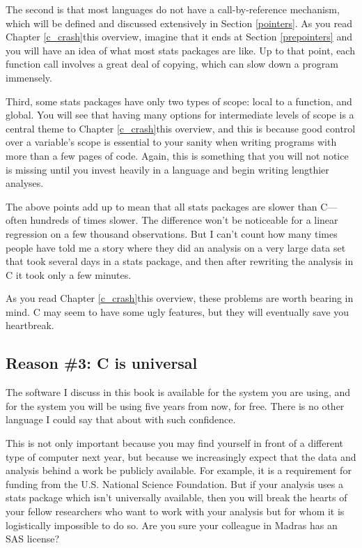 The second is that most languages do not have a call-by-reference
mechanism, which will be defined and discussed extensively in Section
\ref{pointers}. As you read \ifbook Chapter \ref{c_crash}\else this overview\fi, imagine that it ends
at Section \ref{prepointers} and you will have an idea of what most
stats packages are like. Up to that point, each function call involves a
great deal of copying, which can slow down a program immensely.

Third, some stats packages have only two types of scope: local to
a function, and global. You will see that having many options for
intermediate levels of scope is a central theme to \ifbook Chapter \ref{c_crash}\else this overview\fi,
and this is because good control over a variable's scope is essential
to your sanity when writing programs with more than a few pages of
code. Again, this is something that you will not notice is missing until
you invest heavily in a language and begin writing lengthier analyses.

The above points add up to mean that all stats packages are slower
than C---often hundreds of times slower. The difference won't be
noticeable for a linear regression on a few thousand observations. But
I can't count how many times people have told me a story where they did
an analysis on a very large data set that took several days in a stats
package, and then after rewriting the analysis in C it took only a
few minutes.

As you read \ifbook Chapter \ref{c_crash}\else this overview\fi, these
problems are worth bearing in mind. C may seem to have some ugly
features, but they will eventually save you heartbreak.

\subsection{Reason \#3: C is universal} 
The software I discuss in this book is available for the system you
are using, and for the system you will be using five years from now,
for free. There is no other language I could say that about with such
confidence.

This is not only important because you may find yourself in front of
a different type of computer next year, but because we increasingly
expect that the data and analysis behind a work be publicly available.
For example, it is a requirement for funding from the U.S. National
Science Foundation. But if your analysis uses a stats package which
isn't universally available, then you will break the hearts of 
your fellow researchers who want to work with your analysis but for whom
it is logistically impossible to do so. Are you sure your colleague in
Madras has an SAS license?

